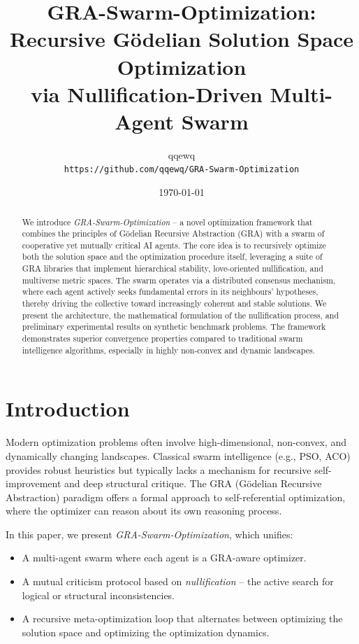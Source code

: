 \documentclass[12pt,a4paper]{article}
\title{GRA-Swarm-Optimization: \\ Recursive Gödelian Solution Space Optimization \\ via Nullification-Driven Multi-Agent Swarm}
\author{qqewq \\ \texttt{https://github.com/qqewq/GRA-Swarm-Optimization}}
\date{\today}
\begin{document}
\maketitle

\begin{abstract}
We introduce \textit{GRA-Swarm-Optimization} -- a novel optimization framework that combines the principles of Gödelian Recursive Abstraction (GRA) with a swarm of cooperative yet mutually critical AI agents. The core idea is to recursively optimize both the solution space and the optimization procedure itself, leveraging a suite of GRA libraries that implement hierarchical stability, love-oriented nullification, and multiverse metric spaces. The swarm operates via a distributed consensus mechanism, where each agent actively seeks fundamental errors in its neighbours' hypotheses, thereby driving the collective toward increasingly coherent and stable solutions. We present the architecture, the mathematical formulation of the nullification process, and preliminary experimental results on synthetic benchmark problems. The framework demonstrates superior convergence properties compared to traditional swarm intelligence algorithms, especially in highly non-convex and dynamic landscapes.
\end{abstract}

\section{Introduction}
Modern optimization problems often involve high-dimensional, non-convex, and dynamically changing landscapes. Classical swarm intelligence (e.g., PSO, ACO) provides robust heuristics but typically lacks a mechanism for recursive self-improvement and deep structural critique. The GRA (Gödelian Recursive Abstraction) paradigm offers a formal approach to self-referential optimization, where the optimizer can reason about its own reasoning process.

In this paper, we present \textit{GRA-Swarm-Optimization}, which unifies:
\begin{itemize}
    \item A multi-agent swarm where each agent is a GRA-aware optimizer.
    \item A mutual criticism protocol based on \textit{nullification} -- the active search for logical or structural inconsistencies.
    \item A recursive meta-optimization loop that alternates between optimizing the solution space and optimizing the optimization dynamics.
\end{itemize}
\end{document}
